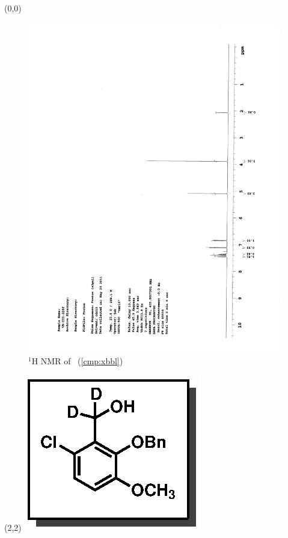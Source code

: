 \begin{textblock}{20}(0,0)
\begin{figure}[htb]
\caption{$^1$H NMR of \CMPxbbl\ (\ref{cmp:xbbl})}
\includegraphics[scale=0.75, trim = 0mm 0mm 0mm 5mm,
clip]{chp_singlecarbon/images/nmr/xbblH}
\vspace{-100pt}
\end{figure}
\end{textblock}
\begin{textblock}{1}(2,2)
\includegraphics[scale=0.8, angle=90]{chp_singlecarbon/images/xbbl}
\end{textblock}
